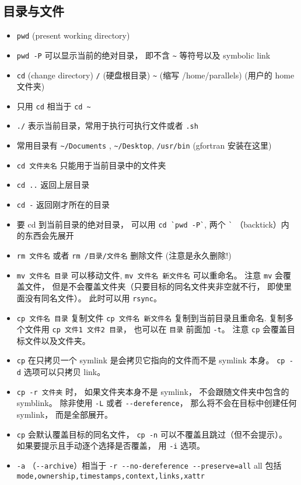 \subsection{目录与文件}
\begin{itemize}
\item \verb`pwd` (present working directory)
\item \verb`pwd -P` 可以显示当前的绝对目录， 即不含 \verb`~` 等符号以及 symbolic link
\item \verb`cd` (change directory) \verb`/` (硬盘根目录) \verb`~` (缩写 /home/parallels) (用户的 home 文件夹)
\item 只用 \verb`cd` 相当于 \verb`cd ~`
\item \verb`./` 表示当前目录，常用于执行可执行文件或者 \verb`.sh`
\item 常用目录有 \verb`~/Documents` ,  \verb`~/Desktop`, \verb`/usr/bin` (gfortran 安装在这里)
\item \verb`cd 文件夹名` 只能用于当前目录中的文件夹
\item \verb`cd ..` 返回上层目录
\item \verb`cd -` 返回刚才所在的目录
\item 要 cd 到当前目录的绝对目录， 可以用 \verb|cd `pwd -P`|, 两个 \verb|`| （backtick）内的东西会先展开
\item \verb`rm 文件名` 或者 \verb`rm /目录/文件名` 删除文件  (注意是永久删除!)
\item \verb`mv 文件名 目录` 可以移动文件, \verb`mv 文件名 新文件名` 可以重命名。 注意 \verb|mv| 会覆盖文件， 但是不会覆盖文件夹（只要目标的同名文件夹非空就不行， 即使里面没有同名文件）。 此时可以用 \verb|rsync|。
\item \verb`cp 文件名 目录` 复制文件 \verb`cp 文件名 新文件名` 复制到当前目录且重命名. 复制多个文件用 \verb`cp 文件1 文件2 目录`， 也可以在 \verb|目录| 前面加 \verb|-t|。 注意 \verb|cp| 会覆盖目标文件以及文件夹。
\item \verb|cp| 在只拷贝一个 symlink 是会拷贝它指向的文件而不是 symlink 本身。 \verb|cp -d| 选项可以只拷贝 link。
\item \verb|cp -r 文件夹| 时， 如果文件夹本身不是 symlink， 不会跟随文件夹中包含的 symblink。 除非使用 \verb|-L| 或者 \verb|--dereference|， 那么将不会在目标中创建任何 symlink， 而是全部展开。
\item \verb|cp| 会默认覆盖目标的同名文件， \verb|cp -n| 可以不覆盖且跳过（但不会提示）。 如果要提示且手动逐个选择是否覆盖， 用 \verb|-i| 选项。
\item \verb|-a| （\verb|--archive|）相当于 \verb|-r --no-dereference --preserve=all| all 包括 \verb|mode,ownership,timestamps,context,links,xattr|

\end{itemize}
